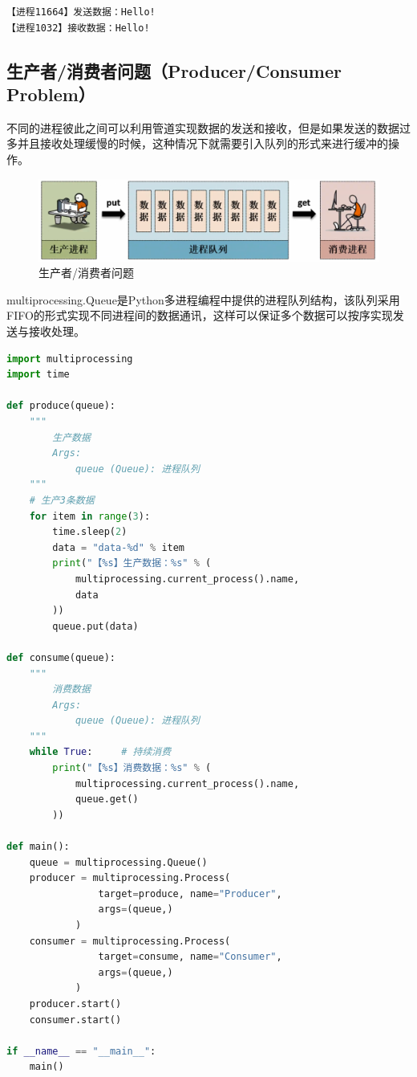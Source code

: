 \begin{tcolorbox}
    \begin{verbatim}
【进程11664】发送数据：Hello!
【进程1032】接收数据：Hello!
	\end{verbatim}
\end{tcolorbox}

\vspace{0.5cm}

\subsection{生产者/消费者问题（Producer/Consumer Problem）}

不同的进程彼此之间可以利用管道实现数据的发送和接收，但是如果发送的数据过多并且接收处理缓慢的时候，这种情况下就需要引入队列的形式来进行缓冲的操作。

\begin{figure}[H]
    \centering
    \includegraphics[scale=0.6]{img/C2/2-5/2.png}
    \caption{生产者/消费者问题}
\end{figure}

multiprocessing.Queue是Python多进程编程中提供的进程队列结构，该队列采用FIFO的形式实现不同进程间的数据通讯，这样可以保证多个数据可以按序实现发送与接收处理。\\


\begin{lstlisting}[language=Python]
import multiprocessing
import time

def produce(queue):
	"""
		生产数据
		Args:
			queue (Queue): 进程队列
	"""
	# 生产3条数据
	for item in range(3):
		time.sleep(2)
		data = "data-%d" % item
		print("【%s】生产数据：%s" % (
			multiprocessing.current_process().name,
			data
		))
		queue.put(data)

def consume(queue):
	"""
		消费数据
		Args:
			queue (Queue): 进程队列
	"""
	while True:     # 持续消费
		print("【%s】消费数据：%s" % (
			multiprocessing.current_process().name,
			queue.get()
		))

def main():
	queue = multiprocessing.Queue()
	producer = multiprocessing.Process(
				target=produce, name="Producer",
				args=(queue,)
			)
	consumer = multiprocessing.Process(
				target=consume, name="Consumer",
				args=(queue,)
			)
	producer.start()
	consumer.start()

if __name__ == "__main__":
	main()
\end{lstlisting}

